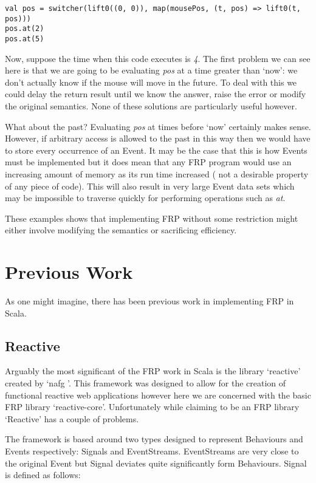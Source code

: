 \begin{verbatim}
val pos = switcher(lift0((0, 0)), map(mousePos, (t, pos) => lift0(t, pos)))
pos.at(2)
pos.at(5)
\end{verbatim}    

      Now, suppose the time when this code executes is \emph{4}. The first problem we can see here
      is that we are going to be evaluating \emph{pos} at a time greater than `now': we don't
      actually know if the mouse will move in the future. To deal with this we could delay the return
      result until we know the answer, raise the error or modify the original semantics. None of these solutions are
      particularly useful however.
      
      What about the past? Evaluating \emph{pos} at times before `now' certainly makes sense. However, if arbitrary
      access is allowed to the past in this way then we would have to store every occurrence
      of an Event. It may be the case that this is how Events must be implemented but it does
      mean that any FRP program would use an increasing amount of memory as its run time increased (
      not a desirable property of any piece of code). This will also result in very large Event data sets which
      may be impossible to traverse quickly for performing operations such as \emph{at}.
      
      These examples shows that implementing FRP without some restriction might either involve modifying the
      semantics or sacrificing efficiency.
  
  \section{Previous Work}
    As one might imagine, there has been previous work in implementing FRP in Scala. 

    \subsection{Reactive}
      Arguably the most significant of the FRP work in Scala is the library `reactive' created by `nafg \cite{Nafg}'. This    
      framework was designed to allow for the creation of functional reactive web applications however here we are concerned 
      with the basic FRP library `reactive-core'. Unfortunately while claiming to be an FRP library `Reactive'
      has a couple of problems.

      The framework is based around two types designed to represent Behaviours and Events respectively: Signals
      and EventStreams. EventStreams are very close to the original Event but Signal deviates quite significantly form 
      Behaviours. Signal is defined as follows:

